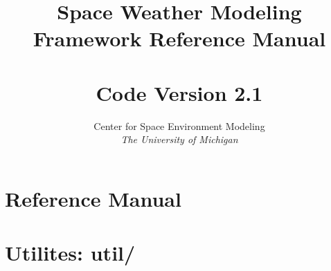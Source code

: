 \documentclass[twoside,10pt]{book}
\title{Space Weather Modeling Framework Reference Manual \\ 
       \hfill \\
       \large Code Version 2.1}
\author{Center for Space Environment Modeling\\
       {\it The University of Michigan}}
\begin{document}
\pagestyle{fancy}
\lhead[\fancyplain{}{\bfseries\thepage}]{\fancyplain{}{\bfseries\rightmark}}
\rhead[\fancyplain{}{\bfseries\leftmark}]{\fancyplain{}{\bfseries\thepage}}
\cfoot{}

\maketitle

\tableofcontents

\chapter{Reference Manual}



\chapter{Utilites: util/}


\end{document}
